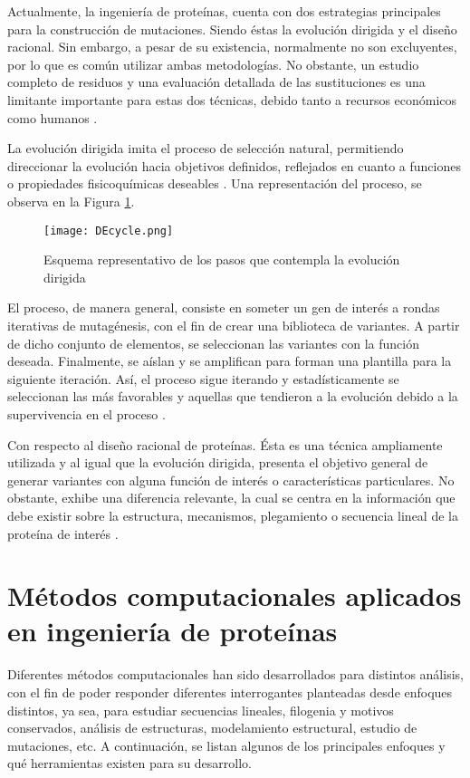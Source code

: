 Actualmente, la ingeniería de proteínas, cuenta con dos estrategias principales para la construcción de mutaciones. Siendo éstas la evolución dirigida y el diseño racional. Sin embargo, a pesar de su existencia, normalmente no son excluyentes, por lo que es común utilizar ambas metodologías. No obstante, un estudio completo de residuos y una evaluación detallada de las sustituciones es una limitante importante para estas dos técnicas, debido tanto a recursos económicos como humanos \cite{liszewski2015speeding}.

La evolución dirigida imita el proceso de selección natural, permitiendo direccionar la evolución hacia objetivos definidos, reflejados en cuanto a funciones o propiedades fisicoquímicas deseables \cite{lutz2010beyond, arnold1998design}. Una representación del proceso, se observa en la Figura \ref{ed}. 

\begin{figure}[!h]
	
	\centering
	\texttt{[image: DEcycle.png]}
	\caption{Esquema representativo de los pasos que contempla la evolución dirigida}
	\label{ed}
\end{figure}

El proceso, de manera general, consiste en someter un gen de interés a rondas iterativas de mutagénesis, con el fin de crear una biblioteca de variantes. A partir de dicho conjunto de elementos, se seleccionan las variantes con la función deseada. Finalmente, se aíslan y se amplifican para forman una plantilla para la siguiente iteración. Así, el proceso sigue iterando y estadísticamente se seleccionan las más favorables y aquellas que tendieron a la evolución debido a la supervivencia en el proceso \cite{arnold1998design}.

Con respecto al diseño racional de proteínas. Ésta es una técnica ampliamente utilizada y al igual que la evolución dirigida, presenta el objetivo general de generar variantes con alguna función de interés o características particulares. No obstante, exhibe una diferencia relevante, la cual se centra en la información que debe existir sobre la estructura, mecanismos, plegamiento o secuencia lineal de la proteína de interés \cite{carpenter1997rational}.

\section{Métodos computacionales aplicados en ingeniería de proteínas}

Diferentes métodos computacionales han sido desarrollados para distintos análisis, con el fin de poder responder diferentes interrogantes planteadas desde enfoques distintos, ya sea, para estudiar secuencias lineales, filogenia y motivos conservados, análisis de estructuras, modelamiento estructural, estudio de mutaciones, etc. A continuación, se listan algunos de los principales enfoques y qué herramientas existen para su desarrollo.

